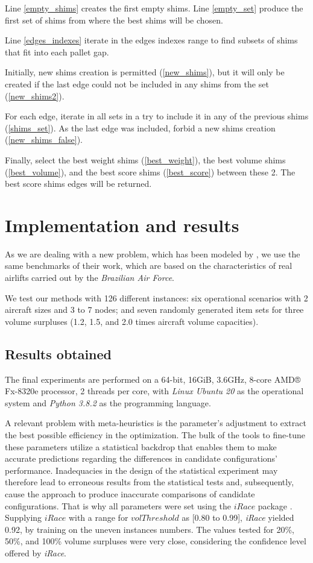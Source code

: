 \documentclass[preprint,authoryear]{elsarticle}
\begin{document}
Line \ref{empty_shims} creates the first empty shims.
Line \ref{empty_set} produce the first set of shims from where the best shims will be chosen.

Line \ref{edges_indexes} iterate in the edges indexes range to find subsets of shims that fit into each pallet gap.

Initially, new shims creation is permitted (\ref{new_shims}), but it will only be created if the last edge could not be included in any shims from the set (\ref{new_shims2}). 

For each edge, iterate in all sets in a try to include it in any of the previous shims (\ref{shims_set}).
As the last edge was included, forbid a new shims creation (\ref{new_shims_false}).

Finally, select the best weight shims (\ref{best_weight}), the best volume shims (\ref{best_volume}), and the best score shims (\ref{best_score}) between these 2. The best score shims edges will be returned.



\section{Implementation and results}
\label{sec6}


As we are dealing with a new problem, which has been modeled by \cite{MesquitaSanches2023}, we use the same benchmarks of their work, which are based on the characteristics of real airlifts carried out by the {\em Brazilian Air Force}.
 
We test our methods with 126 different instances: six operational scenarios with 2 aircraft sizes and 3 to 7 nodes; and seven randomly generated item sets for three volume surpluses (1.2, 1.5, and 2.0 times aircraft volume capacities).


\subsection{Results obtained}

The final experiments are performed on a 64-bit, 16GiB, 3.6GHz, 8-core AMD® Fx-8320e processor, 2 threads per core, with {\it Linux Ubuntu 20} as the operational system and {\it Python 3.8.2} as the programming language.

A relevant problem with meta-heuristics is the parameter's adjustment to extract the best possible efficiency in the optimization. The bulk of the tools to fine-tune these parameters utilize a statistical backdrop that enables them to make accurate predictions regarding the differences in candidate configurations' performance. Inadequacies in the design of the statistical experiment may therefore lead to erroneous results from the statistical tests and, subsequently, cause the approach to produce inaccurate comparisons of candidate configurations. That is why all parameters were set using the $iRace$ package \citep{LopezIbanezManuel2016}. Supplying $iRace$ with a range for $volThreshold$ as [0.80 to 0.99], {\it iRace} yielded 0.92, by training on the uneven instances numbers. The values tested for 20\%, 50\%, and 100\% volume surpluses were very close, considering the confidence level offered by {\it iRace}.
\end{document}
